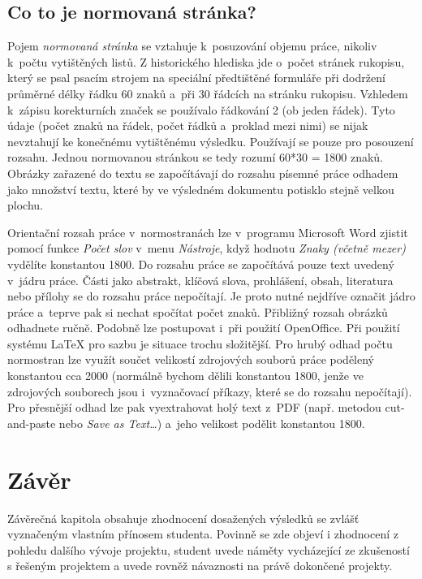 \section{Co to je normovaná stránka?}
Pojem {\it normovaná stránka} se vztahuje k~posuzování objemu práce, nikoliv k~počtu vytištěných listů. Z historického hlediska jde o~počet stránek rukopisu, který se psal psacím strojem na speciální předtištěné formuláře při dodržení průměrné délky řádku 60 znaků a~při 30 řádcích na stránku rukopisu. Vzhledem k~zápisu korekturních značek se používalo řádkování 2 (ob jeden řádek). Tyto údaje (počet znaků na řádek, počet řádků a~proklad mezi nimi) se nijak nevztahují ke konečnému vytištěnému výsledku. Používají se pouze pro posouzení rozsahu. Jednou normovanou stránkou se tedy rozumí 60*30 = 1800 znaků. Obrázky zařazené do textu se započítávají do rozsahu písemné práce odhadem jako množství textu, které by ve výsledném dokumentu potisklo stejně velkou plochu.

Orientační rozsah práce v~normostranách lze v~programu Microsoft Word zjistit pomocí funkce {\it Počet slov} v~menu {\it Nástroje}, když hodnotu {\it Znaky (včetně mezer)} vydělíte konstantou 1800. Do rozsahu práce se započítává pouze text uvedený v~jádru práce. Části jako abstrakt, klíčová slova, prohlášení, obsah, literatura nebo přílohy se do rozsahu práce nepočítají. Je proto nutné nejdříve označit jádro práce a~teprve pak si nechat spočítat počet znaků. Přibližný rozsah obrázků odhadnete ručně. Podobně lze postupovat i~při použití OpenOffice. Při použití systému LaTeX pro sazbu je situace trochu složitější. Pro hrubý odhad počtu normostran lze využít součet velikostí zdrojových souborů práce podělený konstantou cca 2000 (normálně bychom dělili konstantou 1800, jenže ve zdrojových souborech jsou i~vyznačovací příkazy, které se do rozsahu nepočítají). Pro přesnější odhad lze pak vyextrahovat holý text z~PDF (např. metodou cut-and-paste nebo {\it Save as Text\ldots}) a~jeho velikost podělit konstantou 1800. 


\chapter{Závěr}
Závěrečná kapitola obsahuje zhodnocení dosažených výsledků se zvlášť vyznačeným vlastním přínosem studenta. Povinně se zde objeví i zhodnocení z pohledu dalšího vývoje projektu, student uvede náměty vycházející ze zkušeností s řešeným projektem a uvede rovněž návaznosti na právě dokončené projekty.


